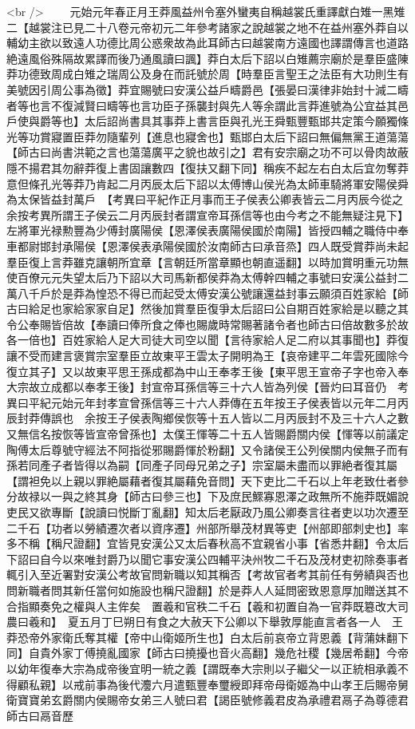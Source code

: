<br />
　　元始元年春正月王莽風益州令塞外蠻夷自稱越裳氏重譯獻白雉一黑雉二【越裳注已見二十八卷元帝初元二年參考諸家之說越裳之地不在益州塞外莽自以輔幼主欲以致遠人功德比周公惑衆故為此耳師古曰越裳南方遠國也譯謂傳言也道路絶遠風俗殊隔故累譯而後乃通風讀曰諷】莽白太后下詔以白雉薦宗廟於是羣臣盛陳莽功德致周成白雉之瑞周公及身在而託號於周【時羣臣言聖王之法臣有大功則生有美號因引周公事為徵】莽宜賜號曰安漢公益戶疇爵邑【張晏曰漢律非始封十減二疇者等也言不復減賢曰疇等也言功臣子孫襲封與先人等余謂此言莽進號為公宜益其邑戶使與爵等也】太后詔尚書具其事莽上書言臣與孔光王舜甄豐甄邯共定策今願獨條光等功賞寢置臣莽勿隨輩列【進息也寢舍也】甄邯白太后下詔曰無偏無黨王道蕩蕩【師古曰尚書洪範之言也蕩蕩廣平之貌也故引之】君有安宗廟之功不可以骨肉故蔽隱不揚君其勿辭莽復上書固讓數四【復扶又翻下同】稱疾不起左右白太后宜勿奪莽意但條孔光等莽乃肯起二月丙辰太后下詔以太傅博山侯光為太師車騎將軍安陽侯舜為太保皆益封萬戶　【考異曰平紀作正月事而王子侯表公卿表皆云二月丙辰今從之　余按考異所謂王子侯云二月丙辰封者謂宣帝耳孫信等也由今考之不能無疑注見下】左將軍光禄勲豐為少傅封廣陽侯【恩澤侯表廣陽侯國於南陽】皆授四輔之職侍中奉車都尉邯封承陽侯【恩澤侯表承陽侯國於汝南師古曰承音烝】四人既受賞莽尚未起羣臣復上言莽雖克讓朝所宜章【言朝廷所當章顯也朝直遥翻】以時加賞明重元功無使百僚元元失望太后乃下詔以大司馬新都侯莽為太傅幹四輔之事號曰安漢公益封二萬八千戶於是莽為惶恐不得已而起受太傅安漢公號讓還益封事云願須百姓家給【師古曰給足也家給家家自足】然後加賞羣臣復爭太后詔曰公自期百姓家給是以聽之其令公奉賜皆倍故【奉讀曰俸所食之俸也賜歲時常賜著諸令者也師古曰倍故數多於故各一倍也】百姓家給人足大司徒大司空以聞【言待家給人足二府以其事聞也】莽復讓不受而建言褒賞宗室羣臣立故東平王雲太子開明為王【哀帝建平二年雲死國除今復立其子】又以故東平思王孫成都為中山王奉孝王後【東平思王宣帝子字也帝入奉大宗故立成都以奉孝王後】封宣帝耳孫信等三十六人皆為列侯【晉灼曰耳音仍　考異曰平紀元始元年封孝宣曾孫信等三十六人莽傳在五年按王子侯表皆以元年二月丙辰封莽傳誤也　余按王子侯表陶鄉侯恢等十五人皆以二月丙辰封不及三十六人之數又無信名按恢等皆宣帝曾孫也】太僕王惲等二十五人皆賜爵關内侯【惲等以前議定陶傅太后尊號守經法不阿指從邪賜爵惲於粉翻】又令諸侯王公列侯關内侯無子而有孫若同產子者皆得以為嗣【同產子同母兄弟之子】宗室屬未盡而以罪絶者復其屬【謂袒免以上親以罪絶屬藉者復其屬藉免音問】天下吏比二千石以上年老致仕者參分故禄以一與之終其身【師古曰參三也】下及庶民鰥寡恩澤之政無所不施莽既媚說吏民又欲專斷【說讀曰悦斷丁亂翻】知太后老厭政乃風公卿奏言往者吏以功次遷至二千石【功者以勞績遷次者以資序遷】州部所舉茂材異等吏【州部即部刺史也】率多不稱【稱尺證翻】宜皆見安漢公又太后春秋高不宜親省小事【省悉井翻】令太后下詔曰自今以來唯封爵乃以聞它事安漢公四輔平決州牧二千石及茂材吏初除奏事者輒引入至近署對安漢公考故官問新職以知其稱否【考故官者考其前任有勞績與否也問新職者問其新任當何如施設也稱尺證翻】於是莽人人延問密致恩意厚加贈送其不合指顯奏免之權與人主侔矣　置羲和官秩二千石【羲和初置自為一官莽既簒改大司農曰羲和】　夏五月丁巳朔日有食之大赦天下公卿以下舉敦厚能直言者各一人　王莽恐帝外家衛氏奪其權【帝中山衛姬所生也】白太后前哀帝立背恩義【背蒲妹翻下同】自貴外家丁傅撓亂國家【師古曰撓擾也音火高翻】幾危社稷【幾居希翻】今帝以幼年復奉大宗為成帝後宜明一統之義【謂既奉大宗則以子繼父一以正統相承義不得顧私親】以戒前事為後代灋六月遣甄豐奉璽綬即拜帝母衛姬為中山孝王后賜帝舅衛寶寶弟玄爵關内侯賜帝女弟三人號曰君【謁臣號修義君皮為承禮君鬲子為尊德君師古曰鬲音歷